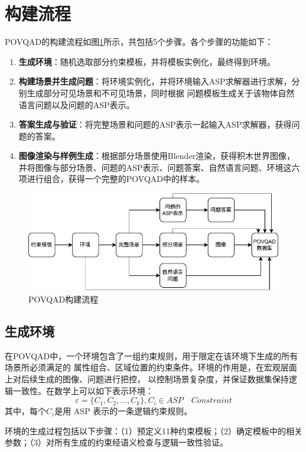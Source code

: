\section{构建流程}
POVQAD的构建流程如图\ref{fig:dataset-generation}所示，共包括5个步骤。各个步骤的功能如下：
\begin{enumerate}[nosep]
\item \textbf{生成环境}：随机选取部分约束模板，并将模板实例化，最终得到环境。
\item \textbf{构建场景并生成问题}：将环境实例化，并将环境输入ASP求解器进行求解，分别生成部分可见场景和不可见场景，同时根据
问题模板生成关于该物体自然语言问题以及问题的ASP表示。
\item \textbf{答案生成与验证}：将完整场景和问题的ASP表示一起输入ASP求解器，获得问题的答案。
\item \textbf{图像渲染与样例生成}：根据部分场景使用Blender渲染，获得积木世界图像，并将图像与部分场景、问题的ASP表示、问题答案、自然语言问题、环境这六项进行组合，获得一个完整的POVQAD中的样本。
\end{enumerate}
\begin{figure}[h]
\centering
\includegraphics{figures/pipeline-POVQAD.drawio-crop.pdf}
\caption{POVQAD构建流程}
\label{fig:dataset-generation}
\end{figure}

\subsection{生成环境}
在POVQAD中，一个环境包含了一组约束规则，用于限定在该环境下生成的所有场景所必须满足的
属性组合、区域位置的约束条件。环境的作用是，在宏观层面上对后续生成的图像、问题进行把控，
以控制场景复杂度，并保证数据集保持逻辑一致性。在数学上可以如下表示环境：
$$ \varepsilon = \{C_1,C_2, ..., C_k \}, C_i \in ASP \quad Constraint $$
其中，每个$C_i$是用 ASP 表示的一条逻辑约束规则。

环境的生成过程包括以下步骤：（1）预定义11种约束模板；（2）确定模板中的相关参数；（3）对所有生成的约束经语义检查与逻辑一致性验证。

